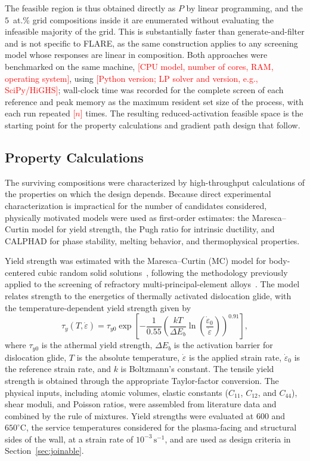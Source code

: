 The feasible region is thus obtained directly as \(P\) by linear programming, and
the \(5\)~at.\% grid compositions inside it are enumerated without evaluating the
infeasible majority of the grid. This is substantially faster than
generate-and-filter and is not specific to FLARE, as the same construction applies
to any screening model whose responses are linear in composition. Both approaches
were benchmarked on the same machine, \textcolor{red}{[CPU model, number of cores,
RAM, operating system]}, using \textcolor{red}{[Python version; LP solver and version,
e.g., SciPy/HiGHS]}; wall-clock time was recorded for the complete screen of each
reference and peak memory as the maximum resident set size of the process, with
each run repeated \textcolor{red}{[\(n\)]} times. The resulting
reduced-activation feasible space is the starting point for the property calculations
and gradient path design that follow.

\subsection{Property Calculations}
\label{sec:feasible-space-props}

The surviving compositions were characterized by high-throughput calculations of
the properties on which the design depends. Because direct experimental
characterization is impractical for the number of candidates considered,
physically motivated models were used as first-order estimates: the
Maresca--Curtin model for yield strength, the Pugh ratio for intrinsic ductility,
and CALPHAD for phase stability, melting behavior, and thermophysical properties.

Yield strength was estimated with the Maresca--Curtin (MC) model for body-centered
cubic random solid solutions~\cite{maresca2020mechanistic}, following the
methodology previously applied to the screening of refractory
multi-principal-element alloys~\cite{vela2023data}. The model relates strength to
the energetics of thermally activated dislocation glide, with the
temperature-dependent yield strength given by
\begin{equation}
\tau_y(T,\dot{\varepsilon})
= \tau_{y0}
\exp\!\left[
-\frac{1}{0.55}
\left(
\frac{kT}{\Delta E_b}
\ln\!\left(\frac{\dot{\varepsilon}_0}{\dot{\varepsilon}}\right)
\right)^{0.91}
\right],
\label{eq:yield_stress}
\end{equation}
where \(\tau_{y0}\) is the athermal yield strength, \(\Delta E_b\) is the
activation barrier for dislocation glide, \(T\) is the absolute temperature,
\(\dot{\varepsilon}\) is the applied strain rate, \(\dot{\varepsilon}_0\) is the
reference strain rate, and \(k\) is Boltzmann's constant. The tensile yield
strength is obtained through the appropriate Taylor-factor conversion. The physical
inputs, including atomic volumes, elastic constants (\(C_{11}\), \(C_{12}\), and
\(C_{44}\)), shear moduli, and Poisson ratios, were assembled from literature data
and combined by the rule of mixtures. Yield strengths were evaluated at \(600\) and
\(650^{\circ}\mathrm{C}\), the service temperatures considered for the
plasma-facing and structural sides of the wall, at a strain rate of
\(10^{-3}\,\mathrm{s}^{-1}\), and are used as design criteria in
Section~\ref{sec:joinable}.


